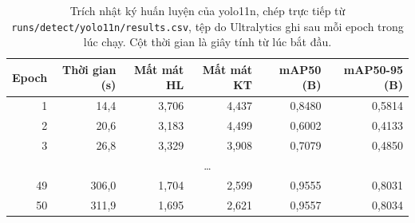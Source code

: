 \begin{table}[H]
\centering
\caption{Trích nhật ký huấn luyện của yolo11n, chép trực tiếp từ \texttt{runs/detect/yolo11n/results.csv}, tệp do Ultralytics ghi sau mỗi epoch trong lúc chạy. Cột thời gian là giây tính từ lúc bắt đầu.}
\label{tab:log}
\small
\begin{tabular}{r r r r r r}
\toprule
Epoch & Thời gian (s) & Mất mát HL & Mất mát KT & mAP50 (B) & mAP50-95 (B) \\
\midrule
1 & 14{,}4 & 3{,}706 & 4{,}437 & 0{,}8480 & 0{,}5814 \\
2 & 20{,}6 & 3{,}183 & 4{,}499 & 0{,}6002 & 0{,}4133 \\
3 & 26{,}8 & 3{,}329 & 3{,}908 & 0{,}7079 & 0{,}4850 \\
\multicolumn{6}{c}{\dots} \\
49 & 306{,}0 & 1{,}704 & 2{,}599 & 0{,}9555 & 0{,}8031 \\
50 & 311{,}9 & 1{,}695 & 2{,}621 & 0{,}9557 & 0{,}8034 \\
\bottomrule
\end{tabular}
\end{table}
